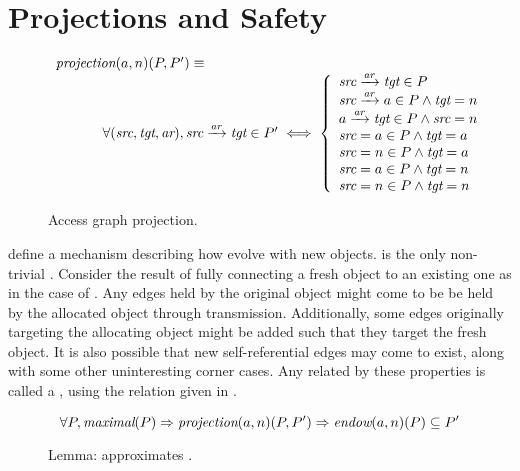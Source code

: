 \section{Projections and Safety}
\label{sect:sketch:projections}

\begin{figure}
  \[
  \begin{array}{l}
    \FNprojectionTwo{a}{n}{P}{P'} \equiv \\
    \makebox[10 mm][l]{}
    \begin{array}{l}
      \forall (\ident{src}, \ident{tgt}, \ident{ar}), \mkEdge{\ident{src}}{\ident{tgt}}{\ident{ar}} \in P' \iff 
      \left\{
      \begin{array}{l}
        \mkEdge{\ident{src}}{\ident{tgt}}{\ident{ar}} \in P  \\
        \mkEdge{\ident{src}}{a}{\ident{ar}} \in P \wedge \ident{tgt} = n \\
        \mkEdge{a}{\ident{tgt}}{\ident{ar}} \in P \wedge \ident{src} = n \\
        \ident{src} = a \in P \wedge \ident{tgt} = a \\
        \ident{src} = n \in P \wedge \ident{tgt} = a \\
        \ident{src} = a \in P \wedge \ident{tgt} = n \\
        \ident{src} = n \in P \wedge \ident{tgt} = n 
      \end{array}
      \right.
    \end{array}
  \end{array}
  \]
  \caption{Access graph projection. \label{fig:sketch:projection}}
\end{figure}


\TMaccessGraph{} \TMprojections{} define a mechanism describing how \TMpotAccOps{} evolve with new objects. 
\xmakefirstuc{\TMendow} is the only non-trivial \TMpotAccOp{}.
Consider the result of fully connecting a fresh object to an existing one as in the case of \NMendow{}.
Any edges held by the original object might come to be be held by the allocated object through transmission.
Additionally, some edges originally targeting the allocating object might be added such that they target the fresh object.
It is also possible that new self-referential edges may come to exist, along with some other uninteresting corner cases.
Any \TMaccessGraph{} related by these properties is called a \term{\TMprojection}, using the \NMprojection{} relation given in .

\begin{figure}
  \[
  \forall P, \textit{maximal}(P) \Rightarrow \textit{projection}(a,n)(P,P') \Rightarrow \textit{endow}(a,n)(P) \subseteq P'
  \]
  \caption{Lemma: \TMprojection{} approximates \TMendow{}. \label{fig:sketch:projectionEndow}}
\end{figure}

